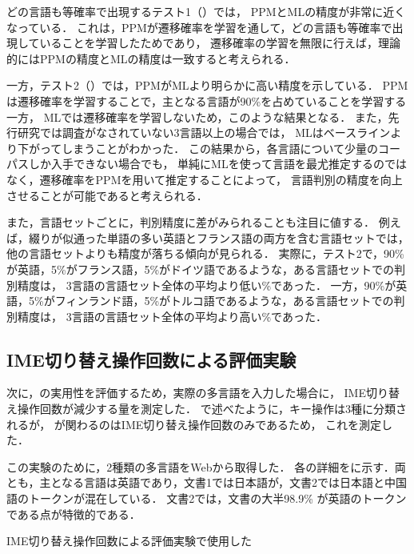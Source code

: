 \documentclass[japanese]{jnlp_1.4}
\newcommand{\name}{}
\newcommand{\secref}[1]{}
\newcommand{\figref}[1]{}
\newcommand{\tabref}[1]{}
\renewcommand{\text}{}
\newcommand{\frenchaccuracy}{}
\newcommand{\estonianaccuracy}{}
\begin{document}
どの言語も等確率で出現するテスト1（\figref{fig:graphtest1}）では，
PPMとMLの精度が非常に近くなっている．
これは，PPMが遷移確率を学習を通して，どの言語も等確率で出現していることを学習したためであり，
遷移確率の学習を無限に行えば，理論的にはPPMの精度とMLの精度は一致すると考えられる．

一方，テスト2（\figref{fig:graphtest2}）では，PPMがMLより明らかに高い精度を示している．
PPMは遷移確率を学習することで，主となる言語が90\%を占めていることを学習する一方，
MLでは遷移確率を学習しないため，このような結果となる．
また，先行研究では調査がなされていない3言語以上の場合では，
MLはベースラインより下がってしまうことがわかった．
この結果から，各言語について少量のコーパスしか入手できない場合でも，
単純にMLを使って言語を最尤推定するのではなく，遷移確率をPPMを用いて推定することによって，
言語判別の精度を向上させることが可能であると考えられる．

また，言語セットごとに，判別精度に差がみられることも注目に値する．
例えば，綴りが似通った単語の多い英語とフランス語の両方を含む言語セットでは，
他の言語セットよりも精度が落ちる傾向が見られる．
実際に，テスト2で，90\%が英語，5\%がフランス語，5\%がドイツ語であるような，ある言語セットでの判別精度は，
3言語の言語セット全体の平均より低い\frenchaccuracy\%であった．
一方，90\%が英語，5\%がフィンランド語，5\%がトルコ語であるような，ある言語セットでの判別精度は，
3言語の言語セット全体の平均より高い\estonianaccuracy\%であった．



\subsection{IME切り替え操作回数による評価実験} 
\label{sec:decrease}

次に，{\name}の実用性を評価するため，実際の多言語{\text}を入力した場合に，
IME切り替え操作回数が減少する量を測定した．
\secref{sec:design}で述べたように，キー操作は3種に分類されるが，
{\name}が関わるのはIME切り替え操作回数のみであるため，
これを測定した．


この実験のために，2種類の多言語{\text}をWebから取得した．
各{\text}の詳細を\tabref{tab:stat}に示す．両{\text}とも，主となる言語は英語であり，文書1では日本語が，文書2では日本語と中国語のトークンが混在している．
文書2では，文書の大半98.9\%
が英語のトークンである点が特徴的である．

\begin{table}[b] 
  \caption{IME切り替え操作回数による評価実験で使用した{\text}} 
  \label{tab:stat} 
  \begin{center} 

  \end{center} 
\end{table} 
\end{document}
